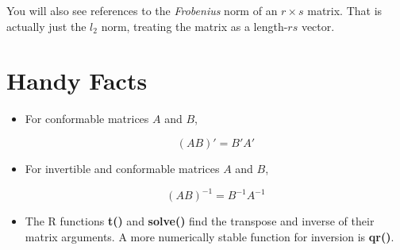 You will also see references to the {\it Frobenius} norm of an $r \times
s$ matrix.  That is actually just the $l_2$ norm, treating the matrix
as a length-$rs$ vector.

\section{Handy Facts}

\begin{itemize}

\item For conformable matrices $A$ and $B$, 

\begin{equation}
(AB)' = B'A'
\end{equation}

\item For invertible and conformable matrices $A$ and $B$, 

\begin{equation}
(AB)^{-1} = B^{-1} A^{-1}
\end{equation}

\item The R functions \textbf{t()} and \textbf{solve()} find the
transpose and inverse of their matrix arguments.  A more numerically
stable function for inversion is \textbf{qr()}.
\end{itemize} 

